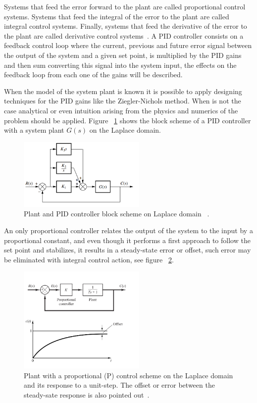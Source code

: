 Systems that feed the error forward to the plant are called proportional control systems. Systems that feed the integral of the error to the plant are called integral control systems. Finally, systems that feed the derivative of the error to the plant are called derivative control systems~\cite[Chapter ~9]{Nise}. A PID controller consists on a feedback control loop where the current, previous and future error signal  between the output of the system and a given set point, is multiplied by the PID gains  and then sum converting this signal into the system input, the effects on the feedback loop from each one of the gains will be described.

 When the model of the system plant is known it is possible to apply designing techniques for the PID gains like the Ziegler-Nichols method. When is not the case analytical or even intuition arising from the physics and numerics of the problem should be applied. Figure ~\ref{PID_scheme} shows the block scheme of a PID controller with a system plant $G(s)$ on the Laplace domain.

\begin{figure}[h]
	\centering
	\includegraphics[width=0.55\textwidth]{Chp2/PID_scheme.png}
	\caption{ Plant and PID controller block scheme on Laplace domain ~\cite[Chapter~ 9]{Nise}. \label{PID_scheme}}
\end{figure}

 An only  proportional controller   relates the output of the system to the input by a proportional constant, and even though it performs a first approach to follow the  set point and stabilizes,  it results in a steady-state error or offset, such error may be eliminated with integral control action, see figure ~\ref{propGain}.
\smallskip

\begin{figure}[h]
	\centering
		\includegraphics[width=0.55\textwidth]{Chp2/propgain.png}
	\caption{ Plant with a proportional (P) control  scheme on the Laplace domain and its response to a unit-step. The offset or error between the steady-sate response is also pointed out~\cite[Chapter~ 5]{Ogata2009}. \label{propGain}}
\end{figure}


